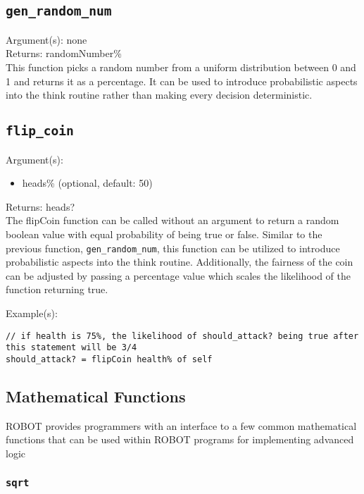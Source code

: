 \documentclass[a4paper]{article}
\begin{document}
\subsection{\texttt{gen\_random\_num}}

Argument(s): none\\

\noindent Returns: randomNumber\%\\

This function picks a random number from a uniform distribution between 0 and 1 and returns it as a percentage.  It can be used to introduce probabilistic aspects into the think routine rather than making every decision deterministic.

\pagebreak

\subsection{\texttt{flip\_coin}}

Argument(s):
\begin{itemize}
	\item heads\% (optional, default: 50)
\end{itemize}

\noindent Returns: heads?\\

The flipCoin function can be called without an argument to return a random boolean value with equal probability of being true or false.  Similar to the previous function, \texttt{gen\_random\_num}, this function can be utilized to introduce probabilistic aspects into the think routine.  Additionally, the fairness of the coin can be adjusted by passing a percentage value which scales the likelihood of the function returning true.

Example(s):
\begin{verbatim}
// if health is 75%, the likelihood of should_attack? being true after this statement will be 3/4
should_attack? = flipCoin health% of self
\end{verbatim}

\subsection{Mathematical Functions}

ROBOT provides programmers with an interface to a few common mathematical functions that can be used within ROBOT programs for implementing advanced logic

\subsubsection{\texttt{sqrt}}
\end{document}
